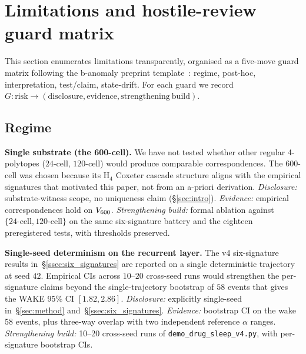 \section{Limitations and hostile-review guard matrix}\label{sec:limitations}

This section enumerates limitations transparently, organised as a
five-move guard matrix following the b-anomaly preprint
template~\citep{SmartBAnomaly2026}: regime, post-hoc, interpretation,
test/claim, state-drift. For each guard we record
$G\colon \mathrm{risk} \to (\mathrm{disclosure}, \mathrm{evidence},
\mathrm{strengthening\ build})$.

\subsection{Regime}\label{ssec:regime}

\textbf{Single substrate (the 600-cell).} We have not tested whether
other regular 4-polytopes ($24$-cell, $120$-cell) would produce
comparable correspondences. The 600-cell was chosen because its
H$_4$ Coxeter cascade structure aligns with the empirical signatures
that motivated this paper, not from an a-priori derivation.
\emph{Disclosure:} substrate-witness scope, no uniqueness claim
(\S\ref{sec:intro}). \emph{Evidence:} empirical correspondences hold
on $V_{600}$. \emph{Strengthening build:} formal ablation against
$\{24\text{-cell}, 120\text{-cell}\}$ on the same six-signature
battery and the eighteen preregistered tests, with thresholds
preserved.

\textbf{Single-seed determinism on the recurrent layer.} The v4
six-signature results in~\S\ref{ssec:six_signatures} are reported on
a single deterministic trajectory at seed $42$. Empirical CIs across
$10$--$20$ cross-seed runs would strengthen the per-signature claims
beyond the single-trajectory bootstrap of $58$ events that gives the
WAKE 95\% CI $[1.82, 2.86]$. \emph{Disclosure:} explicitly single-seed
in~\S\ref{sec:method} and~\S\ref{ssec:six_signatures}.
\emph{Evidence:} bootstrap CI on the wake 58 events, plus three-way
overlap with two independent reference $\alpha$ ranges.
\emph{Strengthening build:} 10--20 cross-seed runs of
\texttt{demo\_drug\_sleep\_v4.py}, with per-signature bootstrap CIs.

